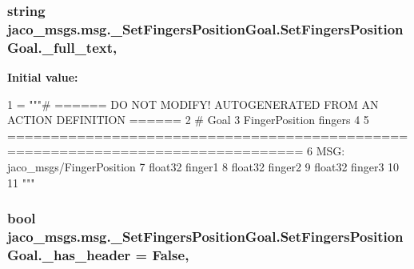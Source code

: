 \subsubsection[{\texorpdfstring{\+\_\+full\+\_\+text}{_full_text}}]{\setlength{\rightskip}{0pt plus 5cm}string jaco\+\_\+msgs.\+msg.\+\_\+\+Set\+Fingers\+Position\+Goal.\+Set\+Fingers\+Position\+Goal.\+\_\+full\+\_\+text\hspace{0.3cm}{\ttfamily [static]}, {\ttfamily [private]}}\hypertarget{classjaco__msgs_1_1msg_1_1__SetFingersPositionGoal_1_1SetFingersPositionGoal_a8d65a11619bd19524cb5ea6011d21f21}{}\label{classjaco__msgs_1_1msg_1_1__SetFingersPositionGoal_1_1SetFingersPositionGoal_a8d65a11619bd19524cb5ea6011d21f21}
{\bfseries Initial value\+:}
\begin{DoxyCode}
1 = \textcolor{stringliteral}{"""# ====== DO NOT MODIFY! AUTOGENERATED FROM AN ACTION DEFINITION ======}
2 \textcolor{stringliteral}{# Goal}
3 \textcolor{stringliteral}{FingerPosition fingers}
4 \textcolor{stringliteral}{}
5 \textcolor{stringliteral}{================================================================================}
6 \textcolor{stringliteral}{MSG: jaco\_msgs/FingerPosition}
7 \textcolor{stringliteral}{float32 finger1}
8 \textcolor{stringliteral}{float32 finger2}
9 \textcolor{stringliteral}{float32 finger3}
10 \textcolor{stringliteral}{}
11 \textcolor{stringliteral}{"""}
\end{DoxyCode}
\subsubsection[{\texorpdfstring{\+\_\+has\+\_\+header}{_has_header}}]{\setlength{\rightskip}{0pt plus 5cm}bool jaco\+\_\+msgs.\+msg.\+\_\+\+Set\+Fingers\+Position\+Goal.\+Set\+Fingers\+Position\+Goal.\+\_\+has\+\_\+header = False\hspace{0.3cm}{\ttfamily [static]}, {\ttfamily [private]}}\hypertarget{classjaco__msgs_1_1msg_1_1__SetFingersPositionGoal_1_1SetFingersPositionGoal_a0443135d5af57a06bb17d1276690b92b}{}\label{classjaco__msgs_1_1msg_1_1__SetFingersPositionGoal_1_1SetFingersPositionGoal_a0443135d5af57a06bb17d1276690b92b}
